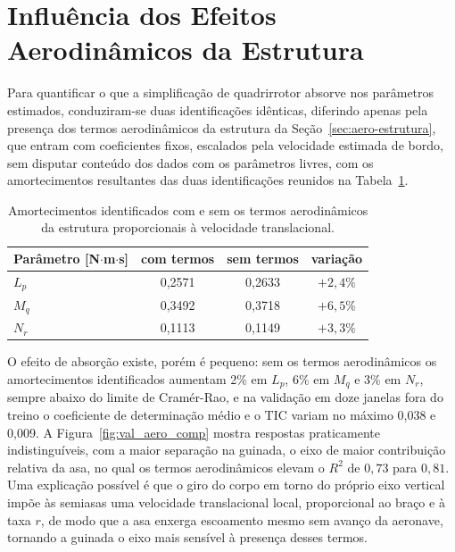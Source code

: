 {\color{blue}
\section[{\color{blue}Influência dos Efeitos Aerodinâmicos da Estrutura}]{Influência dos Efeitos Aerodinâmicos da Estrutura}
\label{sec:aero-influencia}

Para quantificar o que a simplificação de quadrirrotor absorve nos parâmetros estimados, conduziram-se duas identificações idênticas, diferindo apenas pela presença dos termos aerodinâmicos da estrutura da Seção~\ref{sec:aero-estrutura}, que entram com coeficientes fixos, escalados pela velocidade estimada de bordo, sem disputar conteúdo dos dados com os parâmetros livres{\color{blue}, com os amortecimentos resultantes das duas identificações reunidos na Tabela~\ref{tab:aero-absorcao}}.
\begin{table}[ht]
\centering
\caption{\color{blue}Amortecimentos identificados com e sem os termos aerodinâmicos da estrutura proporcionais à velocidade translacional.}
\label{tab:aero-absorcao}
\color{blue}
\begin{tabular}{l c c c}
\toprule
Parâmetro [N$\cdot$m$\cdot$s] & com termos & sem termos & variação \\
\midrule
$L_p$ & 0,2571 & 0,2633 & $+2{,}4\%$ \\
$M_q$ & 0,3492 & 0,3718 & $+6{,}5\%$ \\
$N_r$ & 0,1113 & 0,1149 & $+3{,}3\%$ \\
\bottomrule
\end{tabular}
\end{table}



O efeito de absorção existe, porém é pequeno: sem os termos aerodinâmicos os amortecimentos identificados aumentam 2\% em $L_p$, 6\% em $M_q$ e 3\% em $N_r$, sempre abaixo do limite de Cramér-Rao, e na validação em doze janelas fora do treino o coeficiente de determinação médio e o TIC variam no máximo 0,038 e 0,009. A Figura~\ref{fig:val_aero_comp} mostra respostas praticamente indistinguíveis, com a maior separação na guinada, o eixo de maior contribuição relativa da asa, no qual os termos aerodinâmicos elevam o $R^2$ de $0{,}73$ para $0{,}81$. Uma explicação possível é que o giro do corpo em torno do próprio eixo vertical impõe às semiasas uma velocidade translacional local, proporcional ao braço e à taxa $r$, de modo que a asa enxerga escoamento mesmo sem avanço da aeronave, tornando a guinada o eixo mais sensível à presença desses termos.



}
